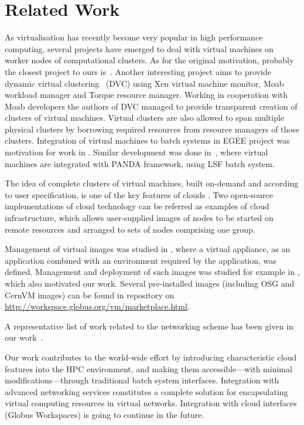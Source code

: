 \documentclass[a4paper]{article}
\begin{document}
\section{Related Work}

As virtualisation has recently become very popular in high performance
computing, several projects have emerged to deal with virtual machines
on worker nodes of computational clusters. As for the original motivation,
probably the closest project to ours is~\cite{karlsruhe}. Another interesting project aims to provide dynamic virtual
clustering~\cite{dvc} (DVC) using Xen virtual machine monitor, Moab workload
manager and Torque resource manager. Working in cooperation with Moab
developers the authors of DVC managed to provide transparent creation of
clusters of virtual machines. Virtual clusters are also allowed to span
multiple physical clusters by borrowing required resources from resource
managers of those clusters. Integration of virtual machines to batch systems 
in EGEE project was motivation for work in \cite{irove}. Similar development 
was done in~\cite{cern}, where virtual machines are integrated with PANDA framework, using LSF batch system.

The idea of complete clusters of virtual machines, built on-demand and according to user specification, is 
one of the key features of clouds \cite{amazon}. Two open-source implementations of cloud technology \cite{workspaces,eucalyptus} 
can be referred as examples of cloud infrastructure, which allows user-supplied images of nodes to be started on
remote resources and arranged to sets of nodes comprising one group.

Management of virtual images was studied in \cite{appliances}, where a virtual appliance, as an application 
combined with an environment required by the application, was defined. Management and deployment of such images was 
studied for example in \cite{teragrid2007}, which also motivated our work. Several pre-installed images 
(including OSG and CernVM images) can be found in repository on \url{http://workspace.globus.org/vm/marketplace.html}.

A representative list of work related to the networking scheme has been
given in our work~\cite{virtcloud-techrep}.

Our work contributes to the world-wide effort by introducing characteristic cloud features into the HPC environment, and making them accessible---with minimal modifications---through traditional batch system interfaces. Integration with advanced networking services constitutes a complete solution for encapsulating virtual computing resources in virtual networks. Integration with cloud interfaces (Globus Workspaces) is going to continue in the future.
\end{document}
